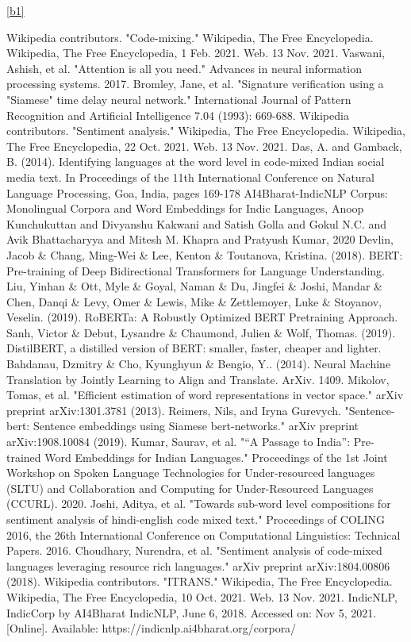 \documentclass[conference]{IEEEtran}
\begin{document}
\ref{b1}
\begin{thebibliography}{00}
Wikipedia contributors. "Code-mixing." Wikipedia, The Free Encyclopedia. Wikipedia, The Free Encyclopedia, 1 Feb. 2021. Web. 13 Nov. 2021.
Vaswani, Ashish, et al. "Attention is all you need." Advances in neural information processing systems. 2017.
 Bromley, Jane, et al. "Signature verification using a 
"Siamese" time delay neural network." International Journal of Pattern Recognition and Artificial Intelligence 7.04 (1993): 669-688.
 Wikipedia contributors. "Sentiment analysis." Wikipedia, The Free Encyclopedia. Wikipedia, The Free Encyclopedia, 22 Oct. 2021. Web. 13 Nov. 2021.
 Das, A. and Gamback, B. (2014). Identifying languages at the word level in code-mixed Indian social media text. In Proceedings of the 11th International Conference on Natural Language Processing, Goa, India, pages 169-178
 AI4Bharat-IndicNLP Corpus: Monolingual Corpora and Word Embeddings for Indic Languages,
    Anoop Kunchukuttan and Divyanshu Kakwani and Satish Golla and Gokul N.C. and Avik Bhattacharyya and Mitesh M. Khapra and Pratyush Kumar, 2020
 Devlin, Jacob \& Chang, Ming-Wei \& Lee, Kenton \& Toutanova, Kristina. (2018). BERT: Pre-training of Deep Bidirectional Transformers for Language Understanding. 
 Liu, Yinhan \& Ott, Myle \& Goyal, Naman \& Du, Jingfei \& Joshi, Mandar \& Chen, Danqi \& Levy, Omer \& Lewis, Mike \& Zettlemoyer, Luke \& Stoyanov, Veselin. (2019). RoBERTa: A Robustly Optimized BERT Pretraining Approach. 
 Sanh, Victor \& Debut, Lysandre \& Chaumond, Julien \& Wolf, Thomas. (2019). DistilBERT, a distilled version of BERT: smaller, faster, cheaper and lighter. 
 Bahdanau, Dzmitry \& Cho, Kyunghyun \& Bengio, Y.. (2014). Neural Machine Translation by Jointly Learning to Align and Translate. ArXiv. 1409.
 Mikolov, Tomas, et al. "Efficient estimation of word representations in vector space." arXiv preprint arXiv:1301.3781 (2013).
 Reimers, Nils, and Iryna Gurevych. "Sentence-bert: Sentence embeddings using Siamese bert-networks." arXiv preprint arXiv:1908.10084 (2019).
 Kumar, Saurav, et al. "“A Passage to India”: Pre-trained Word Embeddings for Indian Languages." Proceedings of the 1st Joint Workshop on Spoken Language Technologies for Under-resourced languages (SLTU) and Collaboration and Computing for Under-Resourced Languages (CCURL). 2020. 
 Joshi, Aditya, et al. "Towards sub-word level compositions for sentiment analysis of hindi-english code mixed text." Proceedings of COLING 2016, the 26th International Conference on Computational Linguistics: Technical Papers. 2016.
 Choudhary, Nurendra, et al. "Sentiment analysis of code-mixed languages leveraging resource rich languages." arXiv preprint arXiv:1804.00806 (2018).
 Wikipedia contributors. "ITRANS." Wikipedia, The Free Encyclopedia. Wikipedia, The Free Encyclopedia, 10 Oct. 2021. Web. 13 Nov. 2021. 
 IndicNLP, IndicCorp by AI4Bharat IndicNLP, June 6, 2018. Accessed on: Nov 5, 2021. [Online]. Available: https://indicnlp.ai4bharat.org/corpora/

\end{thebibliography}
\end{document}
